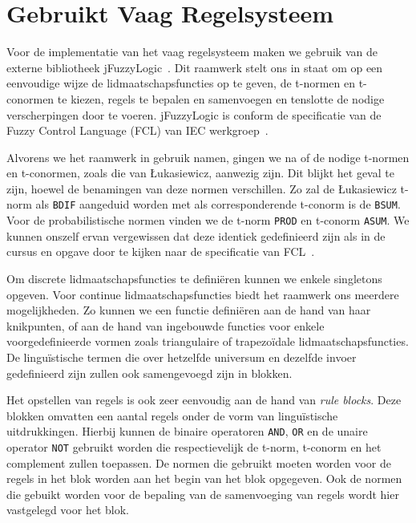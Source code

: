 \documentclass[10pt, a4paper]{article}
\begin{document}


\tableofcontents
\newpage

\thispagestyle{plain}
\section{Gebruikt Vaag Regelsysteem}

Voor de implementatie van het vaag regelsysteem maken we gebruik van de externe bibliotheek jFuzzyLogic~\cite{jfuzzylogic, cingolanijfuzzylogic, cingolani2012jfuzzylogic}. Dit raamwerk stelt ons in staat om op een eenvoudige wijze de lidmaatschapsfuncties op te geven, de t-normen en t-conormen te kiezen, regels te bepalen en samenvoegen en tenslotte de nodige verscherpingen door te voeren. jFuzzyLogic is conform de specificatie van de Fuzzy Control Language (FCL) van IEC werkgroep~\cite{fcl}. 

Alvorens we het raamwerk in gebruik namen, gingen we na of de nodige t-normen en t-conormen, zoals die van \L ukasiewicz, aanwezig zijn. Dit blijkt het geval te zijn, hoewel de benamingen van deze normen verschillen. Zo zal de \L ukasiewicz t-norm als \texttt{BDIF} aangeduid worden met als corresponderende t-conorm is de \texttt{BSUM}. Voor de probabilistische normen vinden we de t-norm \texttt{PROD} en t-conorm \texttt{ASUM}. We kunnen onszelf ervan vergewissen dat deze identiek gedefinieerd zijn als in de cursus en opgave door te kijken naar de specificatie van FCL~\cite{fcl}.

Om discrete lidmaatschapsfuncties te definiëren kunnen we enkele singletons opgeven. Voor continue lidmaatschapsfuncties biedt het raamwerk ons meerdere mogelijkheden. Zo kunnen we een functie definiëren aan de hand van haar knikpunten, of aan de hand van ingebouwde functies voor enkele voorgedefinieerde vormen zoals triangulaire of trapezoïdale lidmaatschapsfuncties. De linguïstische termen die over hetzelfde universum en dezelfde invoer gedefinieerd zijn zullen ook samengevoegd zijn in blokken.

Het opstellen van regels is ook zeer eenvoudig aan de hand van \emph{rule blocks}. Deze blokken omvatten een aantal regels onder de vorm van linguïstische uitdrukkingen. Hierbij kunnen de binaire operatoren \texttt{AND}, \texttt{OR} en de unaire operator \texttt{NOT} gebruikt worden die respectievelijk de t-norm, t-conorm en het complement zullen toepassen. De normen die gebruikt moeten worden voor de regels in het blok worden aan het begin van het blok opgegeven. Ook de normen die gebuikt worden voor de bepaling van de samenvoeging van regels wordt hier vastgelegd voor het blok.
\end{document}
